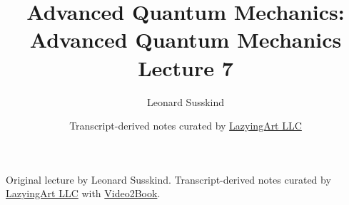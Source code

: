 \documentclass[11pt,oneside]{book}
\begin{document}
\hypersetup{pageanchor=false}
\frontmatter
\title{Advanced Quantum Mechanics: Advanced Quantum Mechanics Lecture 7}
\author{Leonard Susskind}
\date{Transcript-derived notes curated by \href{https://lazying.art}{LazyingArt LLC}}
\maketitle
\begin{center}
\small Original lecture by Leonard Susskind. Transcript-derived notes curated by \href{https://lazying.art}{LazyingArt LLC} with \href{https://github.com/lachlanchen/Video2Book}{Video2Book}.
\end{center}
\clearpage
\hypersetup{pageanchor=true}
\mainmatter

\end{document}
